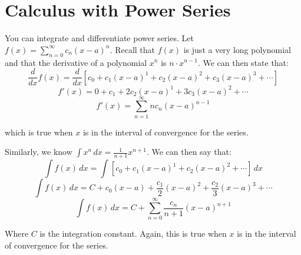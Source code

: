 \section{Calculus with Power Series}
You can integrate and differentiate power series. Let $f(x) = \sum_{n=0}^\infty 
c_n (x-a)^n$. Recall that $f(x)$ is just a very long polynomial and that the 
derivative of a polynomial $x^n$ is $n \cdot x^{n-1}$. We can then state that:
$$\frac{d}{dx}f(x) = \frac{d}{dx} \left[c_0 + c_1(x-a)^1 + c_2(x-a)^2 + c_3(x-a)^3 + \cdots \right]$$
$$f'(x) = 0 + c_1 + 2c_2(x-a)^1 + 3c_3(x-a)^2 + \cdots$$
$$f'(x) = \sum_{n=1}^\infty n c_n(x-a)^{n-1}$$

which is true when $x$ is in the interval of convergence for the series. 

Similarly, we know $\int x^n\,dx = \frac{1}{n+1}x^{n+1}$. We can then say that:
$$\int f(x) \,dx = \int \left[c_0 + c_1(x-a)^1 + c_2(x-a)^2 + \cdots\right]\,dx$$
$$\int f(x)\,dx = C + c_0(x-a) + \frac{c_1}{2}(x-a)^2 + \frac{c_2}{3}(x-a)^3 + 
\cdots$$
$$\int f(x)\,dx = C + \sum_{n=0}^\infty \frac{c_n}{n+1}(x-a)^{n+1}$$

Where $C$ is the integration constant. Again, this is true when $x$ is in the 
interval of convergence for the series. 

